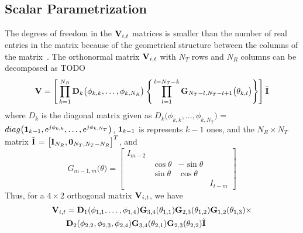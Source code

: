 \documentclass[conference]{IEEEtran}
\begin{document}


\subsection{Scalar Parametrization}
\label{givens}
The degrees of freedom in the $\bV_{i,t}$ matrices is smaller than the
number of real entries in the matrix because of the geometrical
structure between the columns of the matrix~\cite{4114278}. The
orthonormal matrix $\bV_{i,t}$ with $N_T$ rows and $N_R$ columns can be
decomposed as TODO
\begin{equation}
\textbf{V} = \Bigg[\prod_{k=1}^{N_{R}} \bD_{k} \big( \phi_{k,k},\ldots , \phi_{k,N_{R}} \big) \: \Bigg\{ \prod_{l=1}^{l=N_{T}-k} \bG_{N_{T}-l,N_{T} -l+1} \big( \theta_{k,l}\big) \Bigg\} \Bigg] \: \tilde{\bI}
\end{equation}
where $D_{k}$ is the diagonal matrix given as $D_{k}\big(\phi_{k,k},
\ldots, \phi_{k,N_T } \big)$ =  $\mbox{diag}\big( {\bf 1}_{k-1},
e^{j\phi_{k,k}},\ldots, e^{j\phi_{k,N_T }}  \big)$, ${\bf 1}_{k-1}$ is
represents  $k-1$ ones, and the $N_R \times N_T$ matrix $\tilde{\bI}$
= $\big[\bI_{N_R }, {\bf 0}_{N_T ,N_T -N_R }\big]^{T}$, and
\begin{equation}
G_{m-1,m}\big(\theta\big)  =
\begin{bmatrix}
I_{m-2} & & & \\
& \cos\theta & -\sin\theta & \\
& \sin\theta & \cos\theta & \\
& & & I_{t-m}
\end{bmatrix}
\end{equation}
Thus, for a $4 \times 2$ orthogonal matrix $\bV_{i,t}$, we have
\begin{align*}
  \bV_{i,t} & =
  \bD_{1}(\phi_{1,1},\ldots,\phi_{1,4})\bG_{3,4}(\theta_{1,1})
  \bG_{2,3}(\theta_{1,2}) \bG_{1,2}(\theta_{1,3})\times\\
& \bD_{2}(\phi_{2,2},\phi_{2,3},\phi_{2,4}) \bG_{3,4}(\theta_{2,1}) \bG_{2,3}(\theta_{2,2})\tilde{\bI}
\end{align*}
\end{document}
